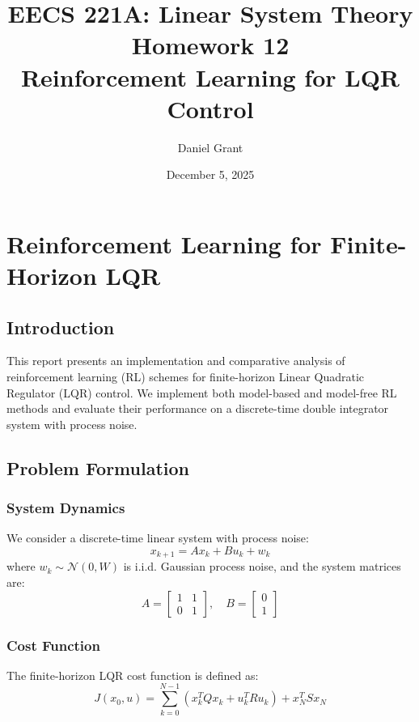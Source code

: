 \documentclass{report}
\title{\Huge{EECS 221A: Linear System Theory}\\Homework 12\\Reinforcement Learning for LQR Control}
\author{\huge{Daniel Grant}}
\date{December 5, 2025}
\begin{document}
\maketitle
\newpage

\chapter{Reinforcement Learning for Finite-Horizon LQR}

\section{Introduction}

This report presents an implementation and comparative analysis of reinforcement learning (RL) schemes for finite-horizon Linear Quadratic Regulator (LQR) control. We implement both model-based and model-free RL methods and evaluate their performance on a discrete-time double integrator system with process noise.

\section{Problem Formulation}

\subsection{System Dynamics}

We consider a discrete-time linear system with process noise:
\begin{equation}
    x_{k+1} = Ax_k + Bu_k + w_k
\end{equation}
where $w_k \sim \mathcal{N}(0, W)$ is i.i.d. Gaussian process noise, and the system matrices are:
\begin{equation}
    A = \begin{bmatrix} 1 & 1 \\ 0 & 1 \end{bmatrix}, \quad B = \begin{bmatrix} 0 \\ 1 \end{bmatrix}
\end{equation}

\subsection{Cost Function}

The finite-horizon LQR cost function is defined as:
\begin{equation}
    J(x_0, u) = \sum_{k=0}^{N-1} \left( x_k^T Q x_k + u_k^T R u_k \right) + x_N^T S x_N
\end{equation}
\end{document}
